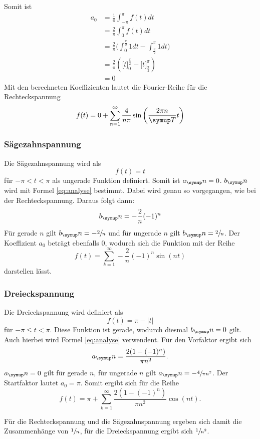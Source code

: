 Somit ist
\begin{align*}
  a_0 &= \frac{1}{\pi}\int_{-\pi}^\pi{f(t) dt} \\
  &= \frac{2}{\pi}\int_0^{\pi}{f(t) dt} \\
  &= \frac{2}{\pi}\biggl(\int_0^{\frac{\pi}{2}}{1 dt} -
  \int^\pi_{\frac{\pi}{2}}{1 dt}\biggr) \\
  &= \frac{2}{\pi}\left(\biggl[t\biggr]_0^{\frac{\pi}{2}} -
  \biggl[t\biggr]_{\frac{\pi}{2}}^\pi\right) \\
  &= 0
\end{align*}
Mit den berechneten Koeffizienten lautet die Fourier-Reihe für die Rechteckspannung
\begin{equation}
  f(t) = 0 + \sum_{n=1}^\infty{\frac{4}{n\pi}\sin{\left(\frac{2\pi n}{\su{T}}t\right)}}
\end{equation}
\newpage
\subsubsection{Sägezahnspannung}
Die Sägezahnspannung wird als
\begin{equation}
  f(t) = t
\end{equation}
für $-\pi < t < \pi$ als ungerade Funktion definiert. Somit ist $a_\su{n}=0$.
$b_\su{n}$ wird mit Formel \eqref{eq:analyse} bestimmt. Dabei wird genau so vorgegangen, wie bei
der Rechteckspannung. Daraus folgt dann:
\begin{equation}
  b_\su{n} = -\frac{2}{n}(-1)^n
\end{equation}
Für gerade $n$ gilt $b_\su{n} = -\sfrac{2}{n}$ und für ungerade $n$ gilt $b_\su{n} = \sfrac{2}{n}$.
Der Koeffizient $a_0$ beträgt ebenfalls 0, wodurch sich die Funktion mit der Reihe
\begin{equation}
  f(t)= \sum_{k=1}^\infty -\frac{2}{n}(-1)^n \sin{(nt)}
\end{equation}
darstellen lässt.
\subsubsection{Dreieckspannung}
Die Dreieckspannung wird definiert als
\begin{equation}
  f(t)= \pi - |t|
\end{equation}
für $-\pi ≤ t < \pi$. Diese Funktion ist gerade, wodurch diesmal $b_\su{n} = 0$ gilt.
Auch hierbei wird Formel \eqref{eq:analyse} verwendent. Für den Vorfaktor ergibt sich
\begin{equation}
  a_\su{n} = \frac{2(1-(-1)^n)}{\pi n^2}.
\end{equation}
$a_\su{n} = 0$ gilt für gerade $n$, für ungerade $n$ gilt $a_\su{n} = -\sfrac{4}{\pi n^2}$.
Der Startfaktor lautet $a_0 = \pi$. Somit ergibt sich für die Reihe
\begin{equation}
  f(t) = \pi + \sum_{k=1}^\infty \frac{2(1-(-1)^n)}{\pi n^2} \cos{(nt)}.
\end{equation}
\par
\noindent Für die Rechteckspannung und die Sägezahnspannung ergeben sich damit die Zusammenhänge
von $\sfrac{1}{n}$, für die Dreieckspannung ergibt sich $\sfrac{1}{n^2}$.
